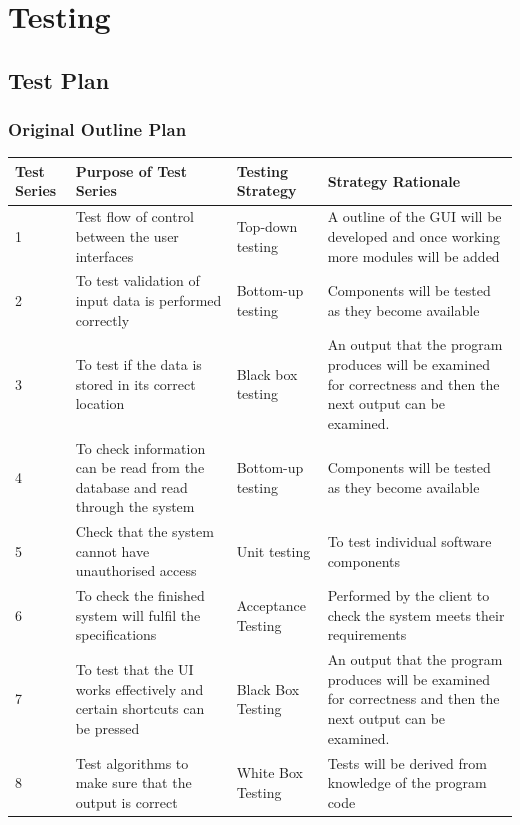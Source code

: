 \chapter{Testing}

\section{Test Plan}

\begin{landscape}
\subsection{Original Outline Plan}

\begin{center}
    \begin{tabular}{|p{2cm}|p{5cm}|p{5cm}|p{4cm}|}
        \hline
        \textbf{Test Series} & \textbf{Purpose of Test Series} & \textbf{Testing Strategy} & \textbf{Strategy Rationale}\\ \hline
1 & Test flow of control between the user interfaces & Top-down testing & A outline of the GUI will be developed and once working more modules will be added \\ \hline
       2 & To test validation of input data is performed correctly & Bottom-up testing & Components will be tested as they become available \\ \hline
3 & To test if the data is stored in its correct location & Black box testing & An output that the program produces will be examined for correctness and then the next output can be examined.\\ \hline
4 & To check information can be read from the database and read through the system & Bottom-up testing &  Components will be tested as they become available\\ \hline
5 & Check that the system cannot have unauthorised access & Unit testing & To test individual software components \\ \hline
6 & To check the finished system will fulfil the specifications &  Acceptance Testing & Performed by the client to check the system meets their requirements\\ \hline
7 & To test that the UI works effectively and certain shortcuts can be pressed & Black Box Testing & An output that the program produces will be examined for correctness and then the next output can be examined.\\ \hline
8 & Test algorithms to make sure that the output is correct & White Box Testing & Tests will be derived from knowledge of the program code \\ \hline


\end{tabular}
\end{center}
\end{landscape}
